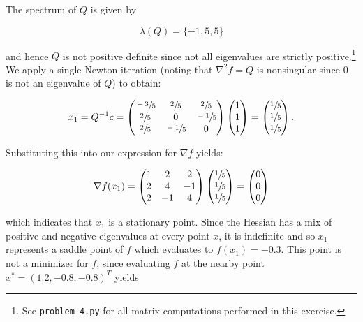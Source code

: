 \begin{solution}
    The spectrum of $Q$ is given by 

    $$
    \lambda(Q) = \{ -1, 5, 5 \}
    $$

    and hence $Q$ is not positive definite since not all eigenvalues are strictly positive.\footnote{
        See \texttt{problem\_4.py} for all matrix computations performed in this exercise.
    } We apply a single Newton iteration (noting that $\nabla^2 f = Q$ is nonsingular since 0 is not an eigenvalue of 
    $Q$) to obtain:

    $$
    x_1 = Q^{-1} c = \begin{pmatrix}
         \sfrac{-3}{5} &  \sfrac{2}{5}  &  \sfrac{2}{5}  \\
         \sfrac{2}{5}  &  0             &  \sfrac{-1}{5} \\
         \sfrac{2}{5}  &  \sfrac{-1}{5} &  0             \\
    \end{pmatrix} \begin{pmatrix}
        1 \\
        1 \\
        1
    \end{pmatrix} = \begin{pmatrix}
        \sfrac{1}{5} \\
        \sfrac{1}{5} \\
        \sfrac{1}{5}
    \end{pmatrix}.
    $$

    Substituting this into our expression for $\nabla f$ yields:

    $$
    \nabla f(x_1) = \begin{pmatrix}
        1 &  2 &  2 \\
        2 &  4 & -1 \\
        2 & -1 & 4
    \end{pmatrix} \begin{pmatrix}
        \sfrac{1}{5} \\
        \sfrac{1}{5} \\
        \sfrac{1}{5}
    \end{pmatrix} = \begin{pmatrix}
        0 \\
        0 \\
        0
    \end{pmatrix}
    $$

    which indicates that $x_1$ is a stationary point. Since the Hessian has a mix of positive and negative eigenvalues
    at every point $x$, it is indefinite and so $x_1$ represents a saddle point of $f$ which evaluates to 
    $f(x_1) = -0.3$. This point is not a minimizer for $f$, since evaluating $f$ at the nearby point 
    $x^* = (1.2, -0.8, -0.8 )^T$ yields 
    

\end{solution}
